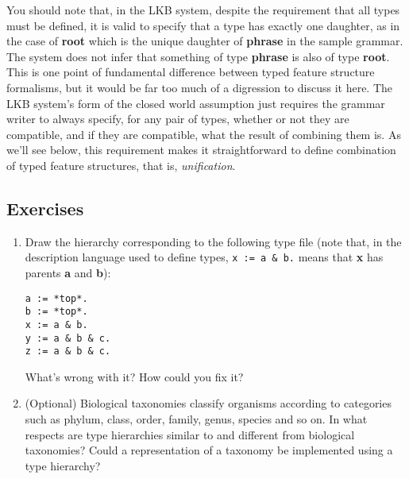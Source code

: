 \documentclass[12pt]{report}
\begin{document}
You should note that, in the LKB system, despite the requirement
that all types must be defined, it is valid to specify that
a type has exactly one daughter, as in the case of {\bf root}
which is the unique daughter of {\bf phrase} in the
sample grammar.  The system does not infer that something of type
{\bf phrase} is also of type {\bf root}.  This is one point of
fundamental difference between typed feature structure formalisms,
but it would be far too much of a digression to discuss it here.
The LKB system's form of the closed world assumption
just requires the grammar writer to always specify, 
for any pair of types, whether or
not they are compatible, and if they are compatible, what the result
of combining them is.  As we'll see below,
this requirement makes it straightforward to define combination of
typed feature structures, that is, {\it unification}.  

\subsection{Exercises}
\begin{enumerate}
\item Draw the hierarchy corresponding to 
the following type file (note that, in the description language
used to define types,
\verb+x := a & b.+ means
that {\bf x} has parents {\bf a} and {\bf b}):
\begin{verbatim}
a := *top*.
b := *top*.
x := a & b.
y := a & b & c.
z := a & b & c.
\end{verbatim}
What's wrong with it?  How could you fix it?
\item (Optional) Biological taxonomies classify organisms
according to categories such as phylum, class, order, family, genus, species and
so on.  In what respects are type hierarchies similar to and different
from biological taxonomies?  Could a representation of a taxonomy
be implemented using a type hierarchy?
\end{enumerate}
\end{document}
